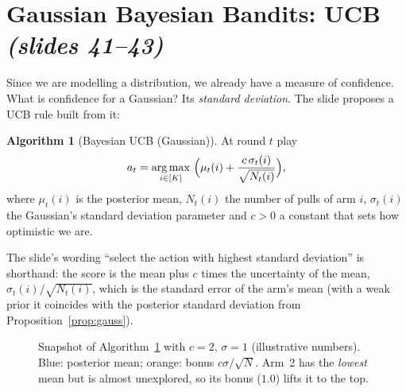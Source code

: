 \documentclass[11pt,a4paper]{article}
\DeclareMathOperator*{\argmax}{arg\,max}
\newcommand{\slides}[1]{\emph{(slides #1)}}
\theoremstyle{plain}
\theoremstyle{definition}
\newtheorem{algorithm}[theorem]{Algorithm}
\theoremstyle{remark}
\begin{document}
\section{Gaussian Bayesian Bandits: UCB \slides{41--43}}

Since we are modelling a distribution, we already have a measure of confidence. What is confidence for a Gaussian? Its \emph{standard deviation}. The slide proposes a UCB rule built from it:

\begin{algorithm}[Bayesian UCB (Gaussian)]\label{alg:bucb}
At round $t$ play
\[
 a_t=\argmax_{i\in[K]}\ \Bigl(\mu_t(i)+\frac{c\,\sigma_t(i)}{\sqrt{N_t(i)}}\Bigr),
\]
where $\mu_t(i)$ is the posterior mean, $N_t(i)$ the number of pulls of arm $i$, $\sigma_t(i)$ the Gaussian's standard deviation parameter and $c>0$ a constant that sets how optimistic we are.
\end{algorithm}

The slide's wording ``select the action with highest standard deviation'' is shorthand: the score is the mean plus $c$ times the uncertainty of the mean, $\sigma_t(i)/\sqrt{N_t(i)}$, which is the standard error of the arm's mean
(with a weak prior it coincides with the posterior standard deviation from Proposition~\ref{prop:gauss}).

\begin{figure}[ht]
\centering
{}
\caption{Snapshot of Algorithm~\ref{alg:bucb} with $c=2$, $\sigma=1$ (illustrative numbers). Blue: posterior mean; orange: bonus $c\sigma/\sqrt{N}$. Arm~2 has the \emph{lowest} mean but is almost unexplored, so its bonus ($1.0$) lifts it to the top.}
\end{figure}
\end{document}

